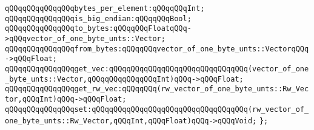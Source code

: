 \verb|qQQqqQQqqQQqqQQqbytes_per_element:qQQqqQQqInt;|\newline
\verb|qQQqqQQqqQQqqQQqis_big_endian:qQQqqQQqBool;|\newline
\verb|qQQqqQQqqQQqqQQqto_bytes:qQQqqQQqFloatqQQq->qQQqvector_of_one_byte_unts::Vector;|\newline
\verb|qQQqqQQqqQQqqQQqfrom_bytes:qQQqqQQqvector_of_one_byte_unts::VectorqQQq->qQQqFloat;|\newline
\verb|qQQqqQQqqQQqqQQqget_vec:qQQqqQQqqQQqqQQqqQQqqQQqqQQqqQQq(vector_of_one_byte_unts::Vector,qQQqqQQqqQQqqQQqInt)qQQq->qQQqFloat;|\newline
\verb|qQQqqQQqqQQqqQQqget_rw_vec:qQQqqQQq(rw_vector_of_one_byte_unts::Rw_Vector,qQQqInt)qQQq->qQQqFloat;|\newline
\verb|qQQqqQQqqQQqqQQqset:qQQqqQQqqQQqqQQqqQQqqQQqqQQqqQQqqQQq(rw_vector_of_one_byte_unts::Rw_Vector,qQQqInt,qQQqFloat)qQQq->qQQqVoid;|\newline
\newline
\verb|};|\newline

